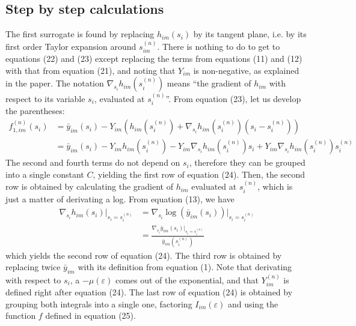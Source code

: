 \documentclass[a4paper, 10pt]{article}
\begin{document}
\subsection{Step by step calculations}
The first surrogate is found by replacing $h_{im}(s_i)$ by its tangent plane, i.e. by its first order Taylor expansion around $s_{im}^{(n)}$. There is nothing to do 
to get to equations (22) and (23) except replacing the terms from equations (11) and (12) with that from equation (21), and noting that $Y_{im}$ is non-negative, as 
explained in the paper. The notation $\nabla_{s_i} h_{im} \left( s_i^{(n)} \right)$ means ``the gradient of $h_{im}$ with respect to its variable $s_i$, evaluated at $s_i^{(n)}$''.
From equation (23), let us develop the parentheses:
\begin{equation*}
 \begin{split}
  f_{1, im}^{(n)}(s_i) &= \bar{y}_{im}(s_i) - Y_{im} \left( h_{im} (s_i^{(n)}) + \nabla_{s_i} h_{im} (s_i^{(n)}) (s_i - s_i^{(n)} )\right) \\
		       &= \bar{y}_{im}(s_i) - Y_{im} h_{im} (s_i^{(n)}) - Y_{im} \nabla_{s_i} h_{im} (s_i^{(n)}) s_i + Y_{im} \nabla_{s_i} h_{im} (s_i^{(n)}) s_i^{(n)}
 \end{split}
\end{equation*}
The second and fourth terms do not depend on $s_i$, therefore they can be grouped into a single constant $C$, yielding the first row of equation (24).
Then, the second row is obtained by calculating the gradient of $h_{im}$ evaluated at $s_i^{(n)}$, which is just a matter of derivating a log.  From equation (13), we have
\begin{equation*}
 \begin{split}
  \nabla_{s_i} h_{im}(s_i)\Bigr|_{s_i = s_i^{(n)}} &= \nabla_{s_i} \log \left( \bar{y}_{im}(s_i) \right)\Bigr|_{s_i = s_i^{(n)}}\\
  &= \frac{\nabla_{s_i} \bar{y}_{im}(s_i)\Bigr|_{s_i = s_i^{(n)}}}{\bar{y}_{im} ( s_i^{(n)} ) }
 \end{split}
\end{equation*}
which yields the second row of equation (24).
The third row is obtained by replacing twice $\bar{y}_{im}$ with its definition from equation (1). Note that derivating with respect to $s_i$, a $-\mu(\varepsilon)$
comes out of the exponential, and that $Y_{im}^{(n)}$ is defined right after equation (24).
The last row of equation (24) is obtained by grouping both integrals into a single one, factoring $I_{im}(\varepsilon)$ and using the function $f$ defined in equation (25).
\end{document}
